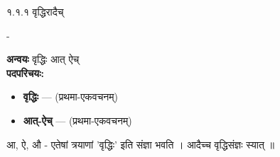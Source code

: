 

\begin{sutra}{१.१.१}
वृद्धिरादैच्
\end{sutra}

\begin{anuvritti}
-
\end{anuvritti}
\begin{padartha}
\textbf{अन्वयः} वृद्धिः आत्  ऐच् \\[4pt]
\textbf{पदपरिचयः:}
\begin{itemize}
    \item \textbf{वृद्धिः} —  (प्रथमा-एकवचनम्) 
    \item \textbf{आत्-ऐच्} — (प्रथमा-एकवचनम्)

\end{itemize}
\end{padartha}

\begin{vyakhya}[व्याख्या]
 आ, ऐ, औ - एतेषां त्रयाणां 'वृद्धिः' इति संज्ञा भवति ।  
  आदैच्च वृद्धिसंज्ञः स्यात् ॥
  
\end{vyakhya}
